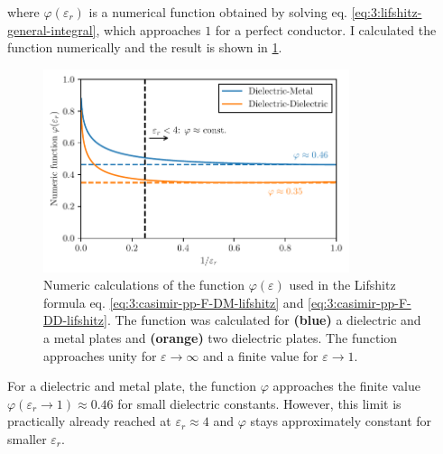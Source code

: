 where $\varphi(\varepsilon_r)$ is a numerical function obtained by solving eq. \eqref{eq:3:lifshitz-general-integral}, which approaches $1$ for a perfect conductor. I calculated the function numerically and the result is shown in \cref{fig:3:lifshitz-function}.
\begin{figure}[!htbp]
  \centering
  \includegraphics[width=0.8\textwidth]{./../figures/casimir-lifshitz-function.pdf}
  \caption{Numeric calculations of the function $\varphi(\varepsilon)$ used in the Lifshitz formula eq. \eqref{eq:3:casimir-pp-F-DM-lifshitz} and \eqref{eq:3:casimir-pp-F-DD-lifshitz}. The function was calculated for \textbf{(blue)} a dielectric and a metal plates and \textbf{(orange)} two dielectric plates. The function approaches unity for $\varepsilon\rightarrow\infty$ and a finite value for $\varepsilon\rightarrow 1$.}
  \label{fig:3:lifshitz-function}
\end{figure}
For a dielectric and metal plate, the function $\varphi$ approaches the finite value $\varphi(\varepsilon_r \rightarrow 1) \approx 0.46$ for small dielectric constants. However, this limit is practically already reached at $\varepsilon_r \approx 4$ and $\varphi$ stays approximately constant for smaller $\varepsilon_r$.






